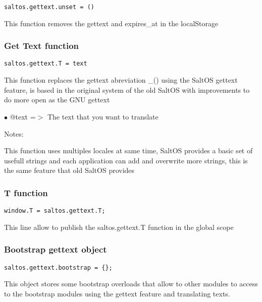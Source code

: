 \documentclass[a4paper]{article}
\begin{document}
\begin{lstlisting}
saltos.gettext.unset = ()
\end{lstlisting}

This function removes the gettext and expires\_at in the localStorage

\hypertarget{toc799}{}
\subsubsection{Get Text function}

\begin{lstlisting}
saltos.gettext.T = text
\end{lstlisting}

This function replaces the gettext abreviation \_() using the SaltOS gettext
feature, is based in the original system of the old SaltOS with improvements
to do more open as the GNU gettext

\begin{compactitem}
\item[\color{myblue}$\bullet$] @text =$>$ The text that you want to translate
\end{compactitem}

Notes:

This function uses multiples locales at same time, SaltOS provides a basic set of
usefull strings and each application can add and overwrite more strings, this is
the same feature that old SaltOS provides

\hypertarget{toc800}{}
\subsubsection{T function}

\begin{lstlisting}
window.T = saltos.gettext.T;
\end{lstlisting}

This line allow to publish the saltos.gettext.T function in the global scope

\hypertarget{toc801}{}
\subsubsection{Bootstrap gettext object}

\begin{lstlisting}
saltos.gettext.bootstrap = {};
\end{lstlisting}

This object stores some bootstrap overloads that allow to other modules to
access to the bootstrap modules using the gettext feature and translating
texts.
\end{document}
